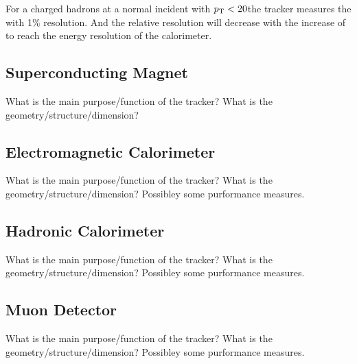 For a charged hadrons at a normal incident with $p_{\mathrm{T}} < 20$\GeV the tracker measures the \pt with 1\% resolution. And the relative resolution will decrease with the increase of \pt to reach the energy resolution of the calorimeter. 

\subsection{Superconducting Magnet}

What is the main purpose/function of the tracker?
What is the geometry/structure/dimension?

\subsection{Electromagnetic Calorimeter}

What is the main purpose/function of the tracker?
What is the geometry/structure/dimension?
Possibley some purformance measures.

\subsection{Hadronic Calorimeter}

What is the main purpose/function of the tracker?
What is the geometry/structure/dimension?
Possibley some purformance measures.

\subsection{Muon Detector}

What is the main purpose/function of the tracker?
What is the geometry/structure/dimension?
Possibley some purformance measures.

